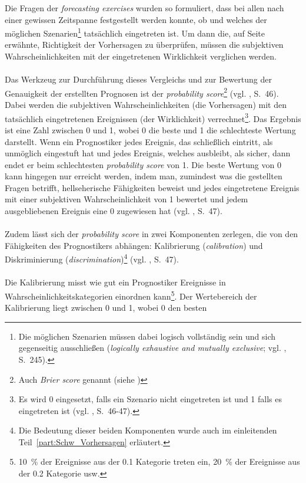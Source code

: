 Die Fragen der \emph{forecasting exercises} wurden so formuliert, dass bei allen
nach einer gewissen Zeitspanne festgestellt werden konnte, ob und welches der
möglichen Szenarien\footnote{
Die möglichen Szenarien müssen dabei logisch vollständig sein und sich
gegenseitig ausschließen (\emph{logically exhaustive and mutually exclusive};
vgl. \cite{Tetlock}, S.~245).
} tatsächlich eingetreten ist. Um dann die, auf Seite~\pageref{misc:Emp_Korr}
erwähnte, Richtigkeit der Vorhersagen zu überprüfen, müssen die subjektiven
Wahrscheinlichkeiten mit der eingetretenen Wirklichkeit verglichen werden. \\ \\
Das Werkzeug zur Durchführung dieses Vergleichs und zur Bewertung der
Genauigkeit der erstellten Prognosen ist der \emph{probability score}\footnote{
  Auch \emph{Brier score} genannt (siehe \xcom)
} (vgl. \cite{Tetlock}, S.~46). Dabei werden die subjektiven
Wahrscheinlichkeiten (die Vorhersagen) mit den tatsächlich eingetretenen
Ereignissen (der Wirklichkeit) verrechnet\footnote{
  Es wird 0 eingesetzt, falls ein Szenario nicht eingetreten ist und 1 falls es
  eingetreten ist (vgl. \cite{Tetlock}, S.~46-47).
}. Das Ergebnis ist eine Zahl zwischen 0 und 1, wobei 0 die beste und 1 die
schlechteste Wertung darstellt. Wenn ein Prognostiker jedes Ereignis, das
schließlich eintritt, als unmöglich eingestuft hat und jedes Ereignis, welches
ausbleibt, als sicher, dann endet er beim schlechtesten \emph{probability
score} von 1. Die beste Wertung von 0 kann hingegen nur erreicht werden, indem
man, zumindest was die gestellten Fragen betrifft, hellseherische Fähigkeiten
beweist und jedes eingetretene Ereignis mit einer subjektiven Wahrscheinlichkeit
von 1 bewertet und jedem ausgebliebenen Ereignis eine 0 zugewiesen hat (vgl.
\cite{Tetlock}, S.~47). \\ \\
Zudem lässt sich der \emph{probability score} in zwei Komponenten zerlegen, die
von den Fähigkeiten des Prognostikers abhängen: Kalibrierung
(\emph{calibration}) und Diskriminierung (\emph{discrimination})\footnote{
  Die Bedeutung dieser beiden Komponenten wurde auch im einleitenden
  Teil~\ref{part:Schw_Vorhersagen} erläutert.
} (vgl. \cite{Tetlock}, S.~47). \\ \\
Die Kalibrierung misst wie gut ein Prognostiker
Ereignisse in Wahrscheinlichkeitskategorien einordnen kann\footnote{
  10~\% der Ereignisse aus der 0.1 Kategorie treten ein, 20~\% der Ereignisse
  aus der 0.2 Kategorie usw. 
}. Der Wertebereich der Kalibrierung liegt zwischen 0 und 1, wobei 0 den besten
